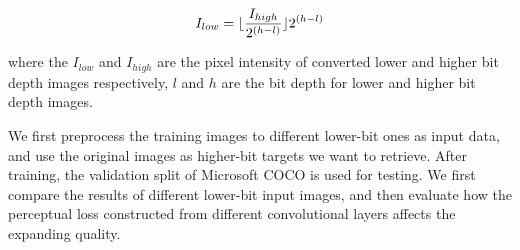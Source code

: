 \documentclass[journal]{IEEEtran}
\begin{document}
\begin{equation}
\footnotesize
I_{low} = \lfloor \frac{I_{high}}{2^{(h - l)}} \rfloor 2^{(h - l)}
\end{equation}

where the $I_{low}$ and $I_{high}$ are the pixel intensity of converted lower and higher bit depth images respectively, $l$ and $h$ are the bit depth for lower and higher bit depth images.


We first preprocess the training images to different lower-bit ones as input data, and use the original images as higher-bit targets we want to retrieve. After training, the validation split of Microsoft COCO is used for testing. We first compare the results of different lower-bit input images, and then evaluate how the perceptual loss constructed from different convolutional layers affects the expanding quality.
\end{document}
